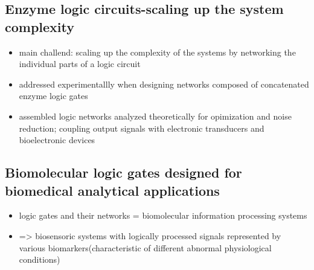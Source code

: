 \documentclass[12pt]{article}
\begin{document}
\subsection{Enzyme logic circuits-scaling up the system complexity}
\begin{itemize}
	\item main challend: scaling up the complexity of the systems by networking the individual parts of a logic circuit 
	\item addressed experimentallly when designing networks composed of concatenated enzyme logic gates
	\item assembled logic networks analyzed theoretically for opimization and noise reduction; coupling output signals with electronic transducers and bioelectronic devices
\end{itemize}
\subsection{Biomolecular logic gates designed for biomedical analytical applications}
\begin{itemize}
	\item logic gates and their networks = biomolecular information processing systems 
	\item => biosensoric systems with logically processed signals represented by various biomarkers(characteristic of different abnormal physiological conditions)
\end{itemize}
	
\end{document}
